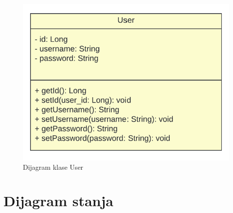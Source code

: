 		   \begin{figure}[H]
				\includegraphics[width=\textwidth]{slike/DijagramKlaseUser.png} 
				\caption{Dijagram klase User} 
	   		\end{figure}
			
			
			
			
			
			\eject
		
		\section{Dijagram stanja}
			
			
			

